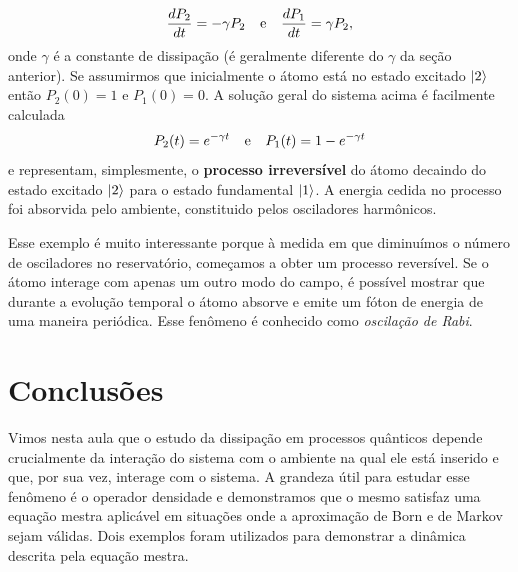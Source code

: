 \documentclass{article}
\begin{document}
\begin{equation}
    \frac{d P_2}{dt} = -\gamma P_2 \hspace{0.25cm} \text{ e } \hspace{0.25cm} \frac{d P_1}{dt} = \gamma P_2,
\end{equation}
onde $\gamma$ é a constante de dissipação (é geralmente diferente do $\gamma$ da seção anterior). Se assumirmos que inicialmente o átomo está no estado excitado $\ket{2}$ então $P_2(0) = 1$ e $P_1(0) = 0$. A solução geral do sistema acima é facilmente calculada
\begin{equation}
    P_2(t) = e^{-\gamma t} \hspace{0.25cm} \text{ e } \hspace{0.25cm} P_1(t) = 1 - e^{-\gamma t}
\end{equation}
e representam, simplesmente, o \textbf{processo irreversível} do átomo decaindo do estado excitado $\ket{2}$ para o estado fundamental $\ket{1}$. A energia cedida no processo foi absorvida pelo ambiente, constituido pelos osciladores harmônicos.

Esse exemplo é muito interessante porque à medida em que diminuímos o número de osciladores no reservatório, começamos a obter um processo reversível. Se o átomo interage com apenas um outro modo do campo, é possível mostrar que durante a evolução temporal o átomo absorve e emite um fóton de energia de uma maneira periódica. Esse fenômeno é conhecido como \textit{oscilação de Rabi}.




\section{Conclusões}

Vimos nesta aula que o estudo da dissipação em processos quânticos depende crucialmente da interação do sistema com o ambiente na qual ele está inserido e que, por sua vez, interage com o sistema. A grandeza útil para estudar esse fenômeno é o operador densidade e demonstramos que o mesmo satisfaz uma equação mestra aplicável em situações onde a aproximação de Born e de Markov sejam válidas. Dois exemplos foram utilizados para demonstrar a dinâmica descrita pela equação mestra. 
\end{document}
